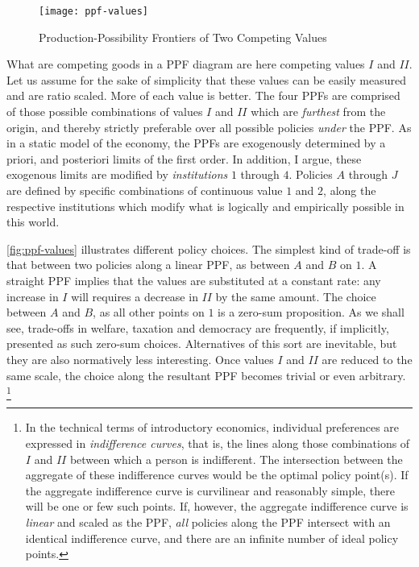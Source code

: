 \begin{figure}[htbp]
	\centering
	\texttt{[image: ppf-values]}
	\caption{Production-Possibility Frontiers of Two Competing Values}
	\label{fig:ppf-values}
\end{figure}%

What are competing goods in a \gls{PPF} diagram are here competing values $I$ and $II$.
Let us assume for the sake of simplicity that these values can be easily measured and are ratio scaled.
More of each value is better.
The four \glspl{PPF} are comprised of those possible combinations of values $I$ and $II$ which are \emph{furthest} from the origin, and thereby strictly preferable over all possible policies \emph{under} the \gls{PPF}.
As in a static model of the economy, the \glspl{PPF} are exogenously determined by a priori, and posteriori limits of the first order.
In addition, I argue, these exogenous limits are modified by \emph{institutions} $1$ through $4$.
Policies $A$ through $J$ are defined by specific combinations of continuous value $1$ and $2$, along the respective institutions which modify what is logically and empirically possible in this world.

\autoref{fig:ppf-values} illustrates different policy choices.
The simplest kind of trade-off is that between two policies along a linear \gls{PPF}, as between $A$ and $B$ on $1$.
A straight \gls{PPF} implies that the values are substituted at a constant rate:
any increase in $I$ will requires a decrease in $II$ by the same amount.
The choice between $A$ and $B$, as all other points on $1$ is a zero-sum proposition.
As we shall see, trade-offs in welfare, taxation and democracy are frequently, if implicitly, presented as such zero-sum choices.
Alternatives of this sort are inevitable, but they are also normatively less interesting.
Once values $I$ and $II$ are reduced to the same scale, the choice along the resultant \gls{PPF} becomes trivial or even arbitrary.
\footnote{
	In the technical terms of introductory economics, individual preferences are expressed in \emph{indifference curves}, that is, the lines along those combinations of $I$ and $II$ between which a person is indifferent.
	The intersection between the aggregate of these indifference curves would be the optimal policy point(s).
	If the aggregate indifference curve is curvilinear and reasonably simple, there will be one or few such points.
	If, however, the aggregate indifference curve is \emph{linear} and scaled as the \gls{PPF}, \emph{all} policies along the \gls{PPF} intersect with an identical indifference curve, and there are an infinite number of ideal policy points.
}

